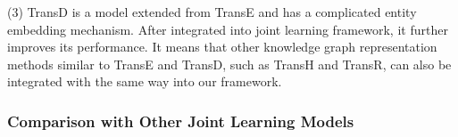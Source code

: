 \documentclass[letterpaper]{article} %
\begin{document}
(3) TransD is a model extended from TransE and has a complicated entity embedding mechanism. After integrated into joint learning framework, it further improves its performance. It means that other knowledge graph representation methods similar to TransE and TransD, such as TransH and TransR, can also be integrated with the same way into our framework.



\begin{table}[]
\centering
{}
\caption{Evaluation results on link prediction of different joint learning models (\%).}
\label{t:compwithjointmodels}
\end{table}

\subsubsection{Comparison with Other Joint Learning Models}
\end{document}
